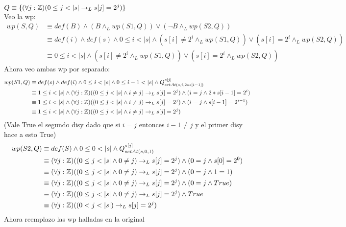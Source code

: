 \documentclass{article}
\begin{document}
{{\begin{itemize}
    $Q\equiv \{(\forall j:\mathbb{Z})(0\leq j < |s| \to_L s[j]=2^{j})\}$\\
    Veo la wp:\\
    \setcounter{equation}{0}\begin{align}
        wp(S,Q)&\equiv def(B) \land (B\land_L wp(S1,Q))\lor(\neg B \land_L wp(S2,Q))\\
        &\equiv def(i)\land def(s) \land 0\leq i<|s| \land (s[i]\neq 2^{i} \land_L wp(S1,Q))\lor( s[i]= 2^{i}\land_L wp(S2,Q))\\
        &\equiv 0\leq i<|s| \land (s[i]\neq 2^{i} \land_L wp(S1,Q))\lor( s[i]= 2^{i}\land_L wp(S2,Q))
    \end{align}
    Ahora veo ambas wp por separado:\\
    \setcounter{equation}{0}\begin{align}
        wp(S1,Q)&\equiv def(s)\land def(i) \land 0\leq i<|s| \land 0\leq i-1<|s| \land Q_{setAt(s,i,2*s[i-1])}^{s[j]}\\
        &\equiv 1\leq i<|s| \land (\forall j:\ent)((0\leq j < |s|\land i\neq j) \to_L s[j]=2^{j}) \land (i=j \land 2*s[i-1]=2^{i})\\
        &\equiv 1\leq i<|s| \land (\forall j:\ent)((0\leq j < |s|\land i\neq j) \to_L s[j]=2^{j}) \land (i=j \land s[i-1]=2^{i-1})\\
        &\equiv 1\leq i<|s| \land (\forall j:\ent)((0\leq j < |s|\land i\neq j) \to_L s[j]=2^{j})
    \end{align}
    (Vale True el segundo disy dado que si $i=j$ entonces $i-1\neq j$ y el primer disy hace a esto True)
    \setcounter{equation}{0}\begin{align}
        wp(S2,Q)&\equiv def(S) \land 0\leq 0<|s| \land Q_{setAt(s,0,1)}^{s[j]}\\
        &\equiv (\forall j:\ent)((0\leq j < |s|\land 0\neq j) \to_L s[j]=2^{j})\land(0= j \land s[0]=2^{0})\\
        &\equiv (\forall j:\ent)((0\leq j < |s|\land 0\neq j) \to_L s[j]=2^{j})\land(0= j \land 1=1)\\
        &\equiv (\forall j:\ent)((0\leq j < |s|\land 0\neq j) \to_L s[j]=2^{j})\land(0= j \land True)\\
        &\equiv (\forall j:\ent)((0\leq j < |s|\land 0\neq j) \to_L s[j]=2^{j})\land True\\
        &\equiv (\forall j:\ent)((0< j < |s|) \to_L s[j]=2^{j})
    \end{align}
    Ahora reemplazo las wp halladas en la original
    \setcounter{equation}{0}\begin{align}

\end{align}
\end{itemize}}}
\end{document}
